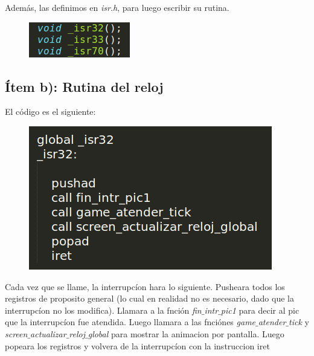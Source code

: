 Además, las definimos en \textit{isr.h}, para luego escribir su rutina.

\begin{figure}[H]
\begin{center}
  \includegraphics[width=\linewidth]{ejercicio5/isr.png}
\endminipage
\end{center}
\end{figure}

\subsection{Ítem b): Rutina del reloj}

El código es el siguiente:
\begin{figure}[H]
\begin{center}
  \includegraphics[width=\linewidth]{ejercicio5/rutinaReloj.png}
\endminipage
\end{center}
\end{figure}

Cada vez que se llame, la interrupcíon hara lo siguiente. Pusheara todos los registros de proposito general (lo cual en realidad no es necesario, dado que la interrupcíon no los modifica). Llamara a la fnción \textit{fin$\_$intr$\_$pic1} para decir al pic que la interrupcíon fue atendida. Luego llamara a las fnciónes \textit{game$\_$atender$\_$tick }y \textit{screen$\_$actualizar$\_$reloj$\_$global} para mostrar la animacion por pantalla. Luego popeara los registros y volvera de la interrupcíon con la instruccion iret



